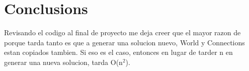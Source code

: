\documentclass{article}
\begin{document}
    \section{Conclusions}
    Revisando el codigo al final de proyecto me deja creer que el mayor razon de porque tarda tanto es que
    a generar una solucion nuevo, World y Connections estan copiados tambien. Si eso es el caso, entonces
    en lugar de tarder n en generar una nueva solucion, tarda O(n$^2$).\\
    
    
\end{document}
